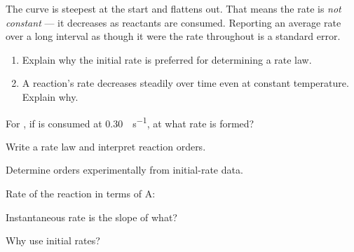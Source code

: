 \documentclass{apchem-notes}
\begin{document}
\begin{apctrap}
The curve is steepest at the start and flattens out. That means the rate is
\emph{not constant} --- it decreases as reactants are consumed. Reporting an
average rate over a long interval as though it were the rate throughout is a
standard error.
\end{apctrap}


\begin{enumerate}[leftmargin=*,itemsep=0.4em]
  \item Explain why the initial rate is preferred for determining a rate
        law. 
  \item A reaction's rate decreases steadily over time even at constant
        temperature. Explain why.
\end{enumerate}

\begin{exitticket}
For , if  is consumed at
\SI{0.30}{\Molar\per\second}, at what rate is  formed?
\end{exitticket}


\begin{objectives}
  \item Write a rate law and interpret reaction orders.
  \item Determine orders experimentally from initial-rate data.
\end{objectives}


\begin{warmup}[3]
  \item Rate of the reaction  in terms of A:
  \item Instantaneous rate is the slope of what?
  \item Why use initial rates? 
\end{warmup}
\end{document}
